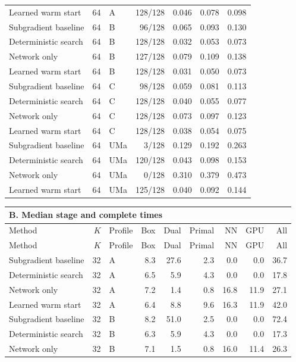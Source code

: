 \documentclass[10pt,letterpaper]{article}
\begin{document}
\begin{longtable}{lrlrrrr}
Learned warm start & 64 & A & 128/128 & 0.046 & 0.078 & 0.098\\
Subgradient baseline & 64 & B & 96/128 & 0.065 & 0.093 & 0.130\\
Deterministic search & 64 & B & 128/128 & 0.032 & 0.053 & 0.073\\
Network only & 64 & B & 127/128 & 0.079 & 0.109 & 0.138\\
Learned warm start & 64 & B & 128/128 & 0.031 & 0.050 & 0.073\\
Subgradient baseline & 64 & C & 98/128 & 0.059 & 0.081 & 0.113\\
Deterministic search & 64 & C & 128/128 & 0.040 & 0.055 & 0.077\\
Network only & 64 & C & 128/128 & 0.073 & 0.097 & 0.123\\
Learned warm start & 64 & C & 128/128 & 0.038 & 0.054 & 0.075\\
Subgradient baseline & 64 & UMa & 3/128 & 0.129 & 0.192 & 0.263\\
Deterministic search & 64 & UMa & 120/128 & 0.043 & 0.098 & 0.153\\
Network only & 64 & UMa & 0/128 & 0.310 & 0.379 & 0.473\\
Learned warm start & 64 & UMa & 125/128 & 0.040 & 0.092 & 0.144\\\end{longtable}\addtocounter{table}{-1}\renewcommand{\theHtable}{\arabic{table}B}\begin{longtable}{lrlrrrrrr}\multicolumn{9}{l}{\textbf{B. Median stage and complete times}}\\\toprule Method & $K$ & Profile & Box & Dual & Primal & NN & GPU & All\\\midrule\endfirsthead\toprule Method & $K$ & Profile & Box & Dual & Primal & NN & GPU & All\\\midrule\endhead\bottomrule\endfoot
Subgradient baseline & 32 & A & 8.3 & 27.6 & 2.3 & 0.0 & 0.0 & 36.7\\
Deterministic search & 32 & A & 6.5 & 5.9 & 4.3 & 0.0 & 0.0 & 17.8\\
Network only & 32 & A & 7.2 & 1.4 & 0.8 & 16.8 & 11.9 & 27.1\\
Learned warm start & 32 & A & 6.4 & 8.8 & 9.6 & 16.3 & 11.9 & 42.0\\
Subgradient baseline & 32 & B & 8.2 & 51.0 & 2.5 & 0.0 & 0.0 & 72.4\\
Deterministic search & 32 & B & 6.3 & 5.9 & 4.3 & 0.0 & 0.0 & 17.3\\
Network only & 32 & B & 7.1 & 1.5 & 0.8 & 16.0 & 11.4 & 26.3\\

\end{longtable}
\end{document}
